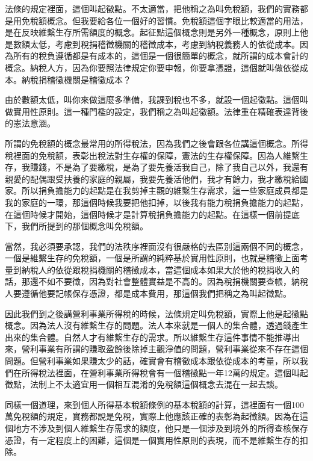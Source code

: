\documentclass[oneside,sub3section]{ctexbook}
\begin{document}
法條的規定裡面，這個叫起徵點。不太適當，把他稱之為叫免稅額，我們的實務都是用免稅額概念。但我要給各位一個好的習慣。免稅額這個字眼比較適當的用法，是在反映維繫生存所需額度的概念。起征點這個概念則是另外一種概念，原則上他是數額太低，考慮到稅捐稽徵機關的稽徵成本，考慮到納稅義務人的依從成本。因為所有的稅負遵循都是有成本的，這個是一個很簡單的概念，就所謂的成本會計的概念。納稅人方，因為你要照法律規定你要申報，你要拿憑證，這個就叫做依從成本。納稅捐稽徵機關是稽徵成本？

由於數額太低，叫你來做這麼多準備，我課到稅也不多，就設一個起徵點。這個叫做實用性原則。這一種門檻的設定，我們稱之為叫起徵額。法律重在精確表達背後的憲法意涵。

所謂的免稅額的概念最常用的所得稅法，因為我們之後會跟各位講這個概念。所得稅裡面的免稅額，表彰出稅法對生存權的保障，憲法的生存權保障。因為人維繫生存，我賺錢，不是為了要繳稅，是為了要先養活我自己，除了我自己以外，我還有親愛的配偶跟受扶養的家庭的親屬，我要先養活他們，我才有餘力，我才繳稅給國家。所以捐負擔能力的起點是在我剪掉主觀的維繫生存需求，這一些家庭成員都是我的家庭的一環，那這個時候我要把他扣掉，以後我有能力稅捐負擔能力的起點，在這個時候才開始，這個時候才是計算稅捐負擔能力的起點。在這樣一個前提底下，我們所提到的那個概念叫免稅額。

當然，我必須要承認，我們的法秩序裡面沒有很嚴格的去區別這兩個不同的概念，一個是維繫生存的免稅額，一個是所謂的純粹基於實用性原則，也就是稽徵上面考量到納稅人的依從跟稅捐機關的稽徵成本，當這個成本如果大於他的稅捐收入的話，那還不如不要徵，因為對社會整體實益是不高的。因為稅捐機關要查帳，納稅人要遵循他要記帳保存憑證，都是成本費用，那這個我們把稱之為叫起徵點。

因此我們到之後講營利事業所得稅的時候，法條規定叫免稅額，實際上他是起徵點概念。因為法人沒有維繫生存的問題。法人本來就是一個人的集合體，透過錢產生出來的集合體。自然人才有維繫生存的需求。所以維繫生存這件事情不能推導出來，營利事業有所謂的賺取盈餘後除掉主觀淨值的問題，營利事業從來不存在這個問題。但營利事業如果賺太少的話，確實會有稽徵成本跟依從成本的考量，所以我們在所得稅法裡面，在營利事業所得稅會有一個稽徵點一年12萬的規定。這個叫起徵點，法制上不太適宜用一個相互混淆的免稅額這個概念去混在一起去談。

同樣一個道理，來到個人所得基本稅額條例的基本稅額的計算，這裡面有一個100萬免稅額的規定，實務都說是免稅，實際上他應該正確的表彰為起徵額。因為在這個地方不涉及到個人維繫生存需求的額度，他只是一個涉及到境外的所得查核保存憑證，有一定程度上的困難，這個是一個實用性原則的表現，而不是維繫生存的扣除。
\end{document}
